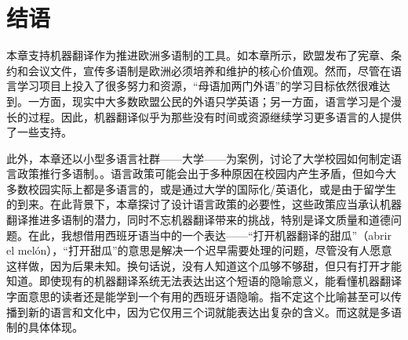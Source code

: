\documentclass[output=paper]{langscibook}
\begin{document}
\section{结语}\largerpage
本章支持机器翻译作为推进欧洲多语制的工具。如本章所示，欧盟发布了宪章、条约和会议文件，宣传多语制是欧洲必须培养和维护的核心价值观。然而，尽管在语言学习项目上投入了很多努力和资源，“母语加两门外语”的学习目标依然很难达到。一方面，现实中大多数欧盟公民的外语只学英语；另一方面，语言学习是个漫长的过程。因此，机器翻译似乎为那些没有时间或资源继续学习更多语言的人提供了一些支持。

此外，本章还以小型多语言社群——大学——为案例，讨论了大学校园如何制定语言政策推行多语制。。语言政策可能会出于多种原因在校园内产生矛盾，但如今大多数校园实际上都是多语言的，或是通过大学的国际化/英语化，或是由于留学生的到来。在此背景下，本章探讨了设计语言政策的必要性，这些政策应当承认机器翻译推进多语制的潜力，同时不忘机器翻译带来的挑战，特别是译文质量和道德问题。在此，我想借用西班牙语当中的一个表达——“打开机器翻译的甜瓜”（abrir el melón），“打开甜瓜”的意思是解决一个迟早需要处理的问题，尽管没有人愿意这样做，因为后果未知。换句话说，没有人知道这个瓜够不够甜，但只有打开才能知道。即使现有的机器翻译系统无法表达出这个短语的隐喻意义，能看懂机器翻译字面意思的读者还是能学到一个有用的西班牙语隐喻。指不定这个比喻甚至可以传播到新的语言和文化中，因为它仅用三个词就能表达出复杂的含义。而这就是多语制的具体体现。\largerpage

\printbibliography[heading=subbibliography,notkeyword=this]
\end{document}
